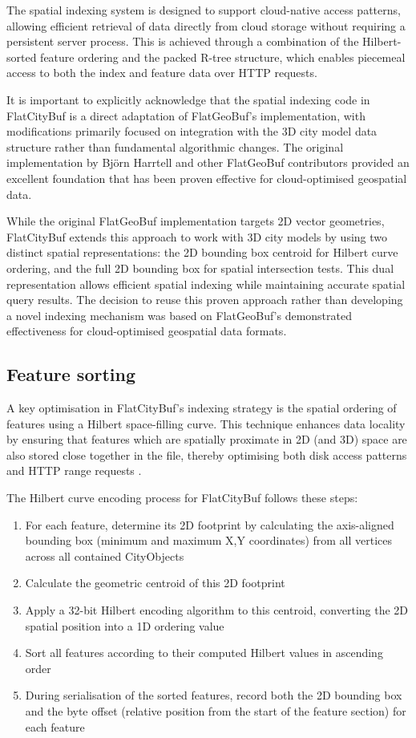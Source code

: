 The spatial indexing system is designed to support cloud-native access patterns, allowing efficient retrieval of data directly from cloud storage without requiring a persistent server process. This is achieved through a combination of the Hilbert-sorted feature ordering and the packed R-tree structure, which enables piecemeal access to both the index and feature data over HTTP requests.

It is important to explicitly acknowledge that the spatial indexing code in FlatCityBuf is a direct adaptation of FlatGeoBuf's implementation, with modifications primarily focused on integration with the 3D city model data structure rather than fundamental algorithmic changes. The original implementation by Björn Harrtell and other FlatGeoBuf contributors \citep{flatgeobuf} provided an excellent foundation that has been proven effective for cloud-optimised geospatial data.

While the original FlatGeoBuf implementation targets 2D vector geometries, FlatCityBuf extends this approach to work with 3D city models by using two distinct spatial representations: the 2D bounding box centroid for Hilbert curve ordering, and the full 2D bounding box for spatial intersection tests. This dual representation allows efficient spatial indexing while maintaining accurate spatial query results. The decision to reuse this proven approach rather than developing a novel indexing mechanism was based on FlatGeoBuf's demonstrated effectiveness for cloud-optimised geospatial data formats.

\subsection{Feature sorting}
\label{methodology:spatial_index:feature_sorting}
A key optimisation in FlatCityBuf's indexing strategy is the spatial ordering of features using a Hilbert space-filling curve. This technique enhances data locality by ensuring that features which are spatially proximate in 2D (and 3D) space are also stored close together in the file, thereby optimising both disk access patterns and HTTP range requests \citep{horance_2022_detail}.

The Hilbert curve encoding process for FlatCityBuf follows these steps:

\begin{enumerate}
  \item For each feature, determine its 2D footprint by calculating the axis-aligned bounding box (minimum and maximum X,Y coordinates) from all vertices across all contained CityObjects
  \item Calculate the geometric centroid of this 2D footprint
  \item Apply a 32-bit Hilbert encoding algorithm to this centroid, converting the 2D spatial position into a 1D ordering value
  \item Sort all features according to their computed Hilbert values in ascending order
  \item During serialisation of the sorted features, record both the 2D bounding box and the byte offset (relative position from the start of the feature section) for each feature
\end{enumerate}

